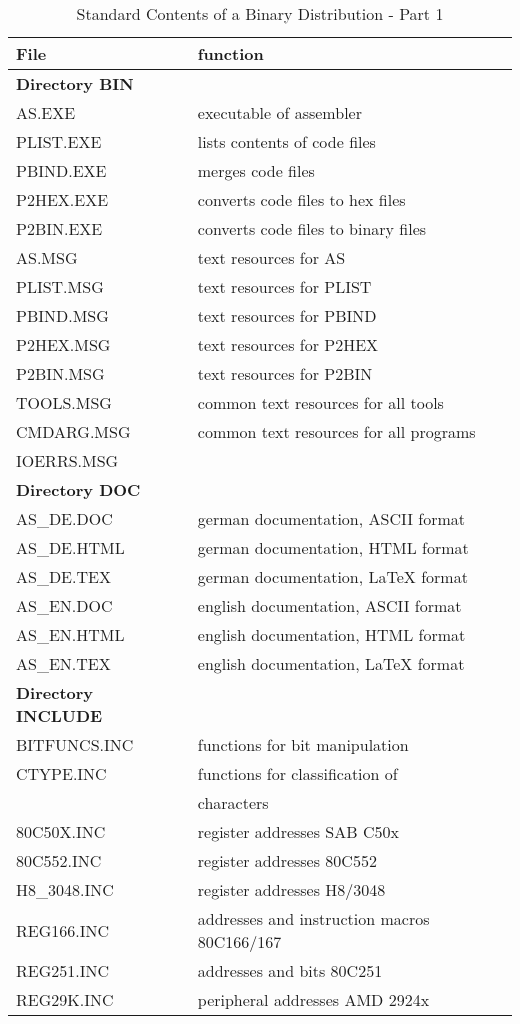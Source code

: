 \documentclass[12pt,twoside]{report}
\begin{document}
\begin{table*}[htp]
\begin{center}\begin{tabular}{|l|l|}
\hline
File              & function \\
\hline
\hline
{\bf Directory BIN} & \\
\hline
AS.EXE            & executable of assembler \\
PLIST.EXE         & lists contents of code files \\
PBIND.EXE         & merges code files \\
P2HEX.EXE         & converts code files to hex files \\
P2BIN.EXE         & converts code files to binary files \\
AS.MSG            & text resources for AS \\
PLIST.MSG         & text resources for PLIST \\
PBIND.MSG         & text resources for PBIND \\
P2HEX.MSG         & text resources for P2HEX \\
P2BIN.MSG         & text resources for P2BIN \\
TOOLS.MSG         & common text resources for all tools \\
CMDARG.MSG        & common text resources for all programs \\
IOERRS.MSG        & \\
\hline
\hline
{\bf Directory DOC} & \\
\hline
AS\_DE.DOC        & german documentation, ASCII format \\
AS\_DE.HTML       & german documentation, HTML format \\
AS\_DE.TEX        & german documentation, LaTeX format \\
AS\_EN.DOC        & english documentation, ASCII format \\
AS\_EN.HTML       & english documentation, HTML format \\
AS\_EN.TEX        & english documentation, LaTeX format \\
\hline
\hline
{\bf Directory INCLUDE} & \\
\hline
BITFUNCS.INC      & functions for bit manipulation \\
CTYPE.INC         & functions for classification of \\
                  & characters \\
80C50X.INC        & register addresses SAB C50x \\
80C552.INC        & register addresses 80C552 \\
H8\_3048.INC      & register addresses H8/3048 \\
REG166.INC        & addresses and instruction macros 80C166/167 \\
REG251.INC        & addresses and bits 80C251 \\
REG29K.INC        & peripheral addresses AMD 2924x \\
\hline
\end{tabular}\end{center}
\caption{Standard Contents of a Binary Distribution - Part 1
         \label{TabCommonPackageList1}}
\end{table*}
\end{document}
